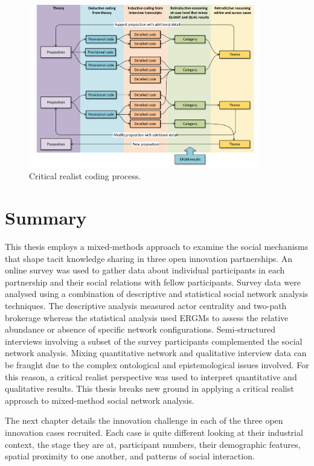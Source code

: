 
\begin{figure}
\centering
\includegraphics[width = 0.9\textwidth,
height = 0.7\textheight, keepaspectratio]{Images/CR.pdf}
\caption[Critical realist coding process]{Critical realist coding process.}
\label{fig:coding_process}
\end{figure}

\section{Summary}

This thesis employs a mixed-methods approach to examine the social mechanisms that shape tacit knowledge sharing in three open innovation partnerships. An online survey was used to gather data about individual participants in each partnership and their social relations with fellow participants. Survey data were analysed using a combination of descriptive and statistical social network analysis techniques. The descriptive analysis measured actor centrality and two-path brokerage whereas the statistical analysis used ERGMs to assess the relative abundance or absence of specific network configurations. Semi-structured interviews involving a subset of the survey participants complemented the social network analysis. Mixing quantitative network and qualitative interview data can be fraught due to the complex ontological and epistemological issues involved. For this reason, a critical realist perspective was used to interpret quantitative and qualitative results. This thesis breaks new ground in applying a critical realist approach to mixed-method social network analysis. \medskip

The next chapter details the innovation challenge in each of the three open innovation cases recruited. Each case is quite different looking at their industrial context, the stage they are at, participant numbers, their demographic features, spatial proximity to one another, and patterns of social interaction. 